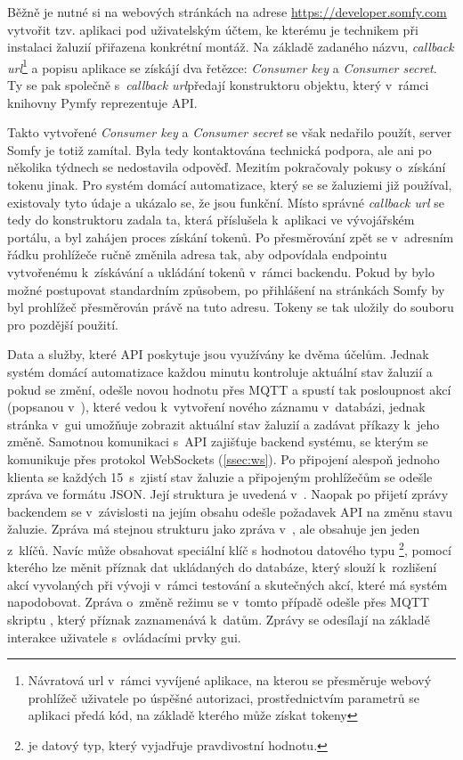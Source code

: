     Běžně je nutné si na webových stránkách na adrese \href{https://develeoper.somfy.com}{https://developer.som\-fy.com} vytvořit tzv. aplikaci pod uživatelským účtem, ke kterému je technikem při instalaci žaluzií přiřazena konkrétní montáž. Na základě zadaného názvu, \emph{callback \acrshort{url}}\footnote[1]{Návratová \acrshort{url} v~rámci vyvíjené aplikace, na kterou se přesměruje webový prohlížeč uživatele po úspěšné autorizaci, prostřednictvím parametrů se aplikaci předá kód, na základě kterého může získat tokeny} a popisu aplikace se získájí dva řetězce: \emph{Consumer key} a \emph{Consumer secret}.\cite{somfy:api} Ty se pak společně s~\emph{callback \acrshort{url}}\footnotemark[1] předají konstruktoru objektu, který v~rámci knihovny Pymfy reprezentuje API.\cite{tetienne:pymfy}

    Takto vytvořené \emph{Consumer key} a \emph{Consumer secret} se však nedařilo použít, server Somfy je totiž zamítal. Byla tedy kontaktována technická podpora, ale ani po několika týdnech se nedostavila odpověď. Mezitím pokračovaly pokusy o~získání tokenu jinak. Pro systém domácí automatizace, který se se žaluziemi již používal, existovaly tyto údaje a ukázalo se, že jsou funkční. Místo správné \emph{callback \acrshort{url}} se tedy do konstruktoru zadala ta, která příslušela k~aplikaci ve vývojářském portálu, a byl zahájen proces získání tokenů. Po přesměrování zpět se v~adresním řádku prohlížeče ručně změnila adresa tak, aby odpovídala endpointu vytvořenému k~získávání a ukládání tokenů v~rámci backendu. Pokud by bylo možné postupovat standardním způsobem, po přihlášení na stránkách Somfy by byl prohlížeč přesměrován právě na tuto adresu. Tokeny se tak uložily do souboru  pro pozdější použití.

    Data a služby, které API poskytuje jsou využívány ke dvěma účelům. Jednak systém domácí automatizace každou minutu kontroluje aktuální stav žaluzií a pokud se změní, odešle novou hodnotu přes MQTT a spustí tak posloupnost akcí (popsanou v~), které vedou k~vytvoření nového záznamu v~databázi, jednak stránka  v~\acrshort{gui} umožňuje zobrazit aktuální stav žaluzií a zadávat příkazy k~jeho změně. Samotnou komunikaci s~API zajišťuje backend systému, se kterým se komunikuje přes protokol WebSockets (\cref{ssec:ws}). Po připojení alespoň jednoho klienta se každých 15~s~zjistí stav žaluzie a připojeným prohlížečům se odešle zpráva ve formátu JSON. Její struktura je uvedená v~. Naopak po přijetí zprávy backendem se v~závislosti na jejím obsahu odešle požadavek API na změnu stavu žaluzie. Zpráva má stejnou strukturu jako zpráva v~, ale obsahuje jen jeden z~klíčů. Navíc může obsahovat speciální klíč  s hodnotou datového typu \footnote{ je datový typ, který vyjadřuje pravdivostní hodnotu.}, pomocí kterého lze měnit příznak  dat ukládaných do databáze, který slouží k~rozlišení akcí vyvolaných při vývoji v~rámci testování a skutečných akcí, které má systém napodobovat. Zpráva o~změně režimu se v~tomto případě odešle přes MQTT skriptu , který příznak zaznamenává k~datům. Zprávy se odesílají na základě interakce uživatele s~ovládacími prvky \acrshort{gui}.

